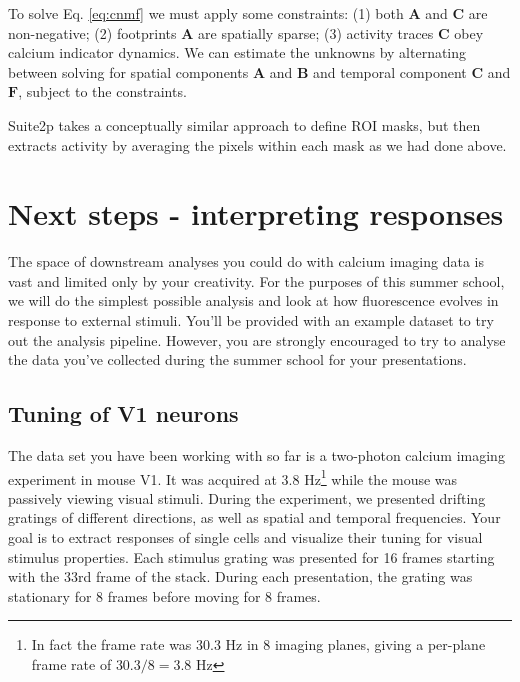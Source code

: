 \documentclass[a4paper]{report}
\begin{document}
To solve Eq. \ref{eq:cnmf} we must apply some constraints: (1) both $\mathbf{A}$ and $\mathbf{C}$ are non-negative; (2) footprints $\mathbf{A}$ are spatially sparse; (3) activity traces $\mathbf{C}$ obey calcium indicator dynamics. We can estimate the unknowns by alternating between solving for spatial components $\mathbf{A}$ and $\mathbf{B}$ and temporal component $\mathbf{C}$ and $\mathbf{F}$, subject to the constraints.

Suite2p takes a conceptually similar approach to define ROI masks, but then extracts activity by averaging the pixels within each mask as we had done above.

\section{Next steps - interpreting responses}
The space of downstream analyses you could do with calcium imaging data is vast and limited only by your creativity. 
For the purposes of this summer school, we will do the simplest possible analysis and look at how fluorescence evolves in response to external stimuli. 
You'll be provided with an example dataset to try out the analysis pipeline.
However, you are strongly encouraged to try to analyse the data you've collected during the summer school for your presentations.

\subsection{Tuning of V1 neurons}
The data set you have been working with so far is a two-photon calcium imaging experiment in mouse V1. 
It was acquired at 3.8 Hz\footnote{In fact the frame rate was 30.3 Hz in 8 imaging planes, giving a per-plane frame rate of $30.3/8 = 3.8$ Hz} while the mouse was passively viewing visual stimuli.
During the experiment, we presented drifting gratings of different directions, as well as spatial and temporal frequencies.
Your goal is to extract responses of single cells and visualize their tuning for visual stimulus properties. 
Each stimulus grating was presented for 16 frames starting with the 33rd frame of the stack.
During each presentation, the grating was stationary for 8 frames before moving for 8 frames.
\end{document}

